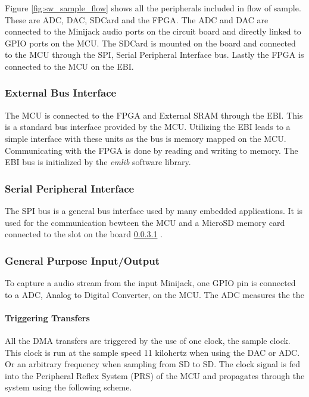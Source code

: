 
Figure \ref{fig:sw_sample_flow} shows all the peripherals included in flow of sample. 
These are ADC, DAC, SDCard and the FPGA. The ADC and DAC are connected to the Minijack
audio ports on the circuit board and directly linked to GPIO ports on the MCU. The SDCard
is mounted on the board and connected to the MCU through the SPI, Serial Peripheral Interface
bus. Lastly the FPGA is connected to the MCU on the EBI.

\subsubsection{External Bus Interface}
The MCU is connected to the FPGA and External SRAM through the EBI. This is a standard
bus interface provided by the MCU. Utilizing the EBI leads to a
simple interface with these units as the bus is memory mapped on the MCU.
Communicating with the FPGA is done by reading and writing to memory.
The EBI bus is initialized by the {\it emlib} software library.

\subsubsection{Serial Peripheral Interface}
The SPI bus is a general bus interface used by many embedded applications. It is used
for the communication bewteen the MCU and a MicroSD memory card connected to the slot
on the board \ref{} . 

\subsubsection{General Purpose Input/Output}
To capture a audio stream from the input Minijack, one GPIO pin is connected to a 
ADC, Analog to Digital Converter, on the MCU. The ADC measures the the 


\paragraph{Triggering Transfers}

All the DMA transfers are triggered by the use of one clock, the sample clock.
This clock is run at the sample speed 11 kilohertz when using the DAC or ADC. Or
an arbitrary frequency when sampling from SD to SD. The clock signal is fed into
the Peripheral Reflex System  (PRS) of the MCU and propagates through the system
using the following scheme.

